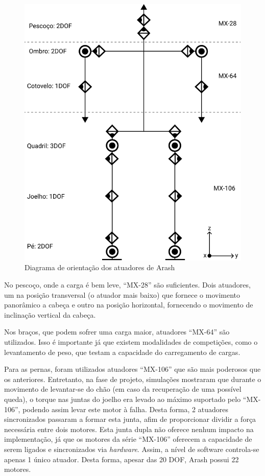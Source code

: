 \begin{figure}[htb]
	\centering
	\includegraphics[scale=1]{imagens/svg/arash-schematics}
	\caption{Diagrama de orientação dos atuadores de Arash}
	\label{fig:ArashSchematics}
\end{figure}

No pescoço, onde a carga é bem leve, ``MX-28'' são suficientes. Dois atuadores, um na posição transversal (o atuador mais baixo) que fornece o movimento panorâmico a cabeça e outro na posição horizontal, fornecendo o movimento de inclinação vertical da cabeça.

Nos braços, que podem sofrer uma carga maior, atuadores ``MX-64'' são utilizados. Isso é importante já que existem modalidades de competições, como o levantamento de peso, que testam a capacidade do carregamento de cargas.

Para as pernas, foram utilizados atuadores ``MX-106'' que são mais poderosos que os anteriores. Entretanto, na fase de projeto, simulações mostraram que durante o movimento de levantar-se do chão (em caso da recuperação de uma possível queda), o torque nas juntas do joelho era levado ao máximo suportado pelo ``MX-106'', podendo assim levar este motor à falha. Desta forma, 2 atuadores sincronizados passaram a formar esta junta, afim de proporcionar dividir a força necessária entre dois motores. Esta junta dupla não oferece nenhum impacto na implementação, já que os motores da série ``MX-106'' oferecem a capacidade de serem ligados e sincronizados via \textit{hardware}. Assim, a nível de software controla-se apenas 1 único atuador. Desta forma, apesar das 20 DOF, Arash possui 22 motores.

